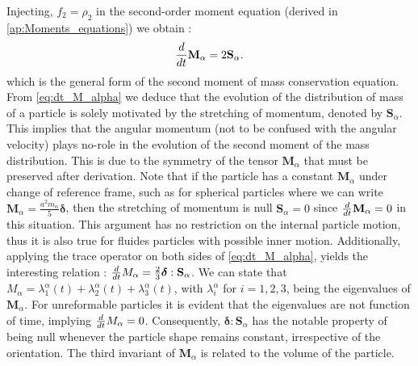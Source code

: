 Injecting, $f_2 = \rho_2$ in the second-order moment equation (derived in \ref{ap:Moments_equations}) we obtain :
\begin{equation}
    \frac{d}{dt} {\textbf{M}_\alpha}=2\textbf{S}_\alpha. 
    \label{eq:dt_M_alpha}
\end{equation}
which is the general form of the second moment of mass conservation equation. 
From \ref{eq:dt_M_alpha} we deduce that the evolution of the distribution of mass of a particle is solely motivated by the stretching of momentum, denoted by $\textbf{S}_\alpha$. 
This implies that the angular momentum (not to be confused with the angular velocity) plays no-role in the evolution of the second moment of the mass distribution. 
This is due to the symmetry of the tensor $\textbf{M}_\alpha$ that must be preserved after derivation. 
Note that if the particle has a constant $\textbf{M}_\alpha$ under change of reference frame, such as for spherical particles where we can write $\textbf{M}_\alpha= \frac{a^2 m_\alpha}{5} \bm\delta$, then the stretching of momentum is null $\textbf{S}_\alpha=0$ since $\frac{d}{dt} \textbf{M}_\alpha = 0$ in this situation.
This argument has no restriction on the internal particle motion, thus it is also true for fluides particles with possible inner motion. 
Additionally, applying the trace operator on both sides of \ref{eq:dt_M_alpha}, yields the interesting relation : $\frac{d}{dt} {M_\alpha}=\frac{2}{3}\bm\delta : \textbf{S}_\alpha$.
We can state that $M_\alpha = \lambda^\alpha_1(t)+\lambda^\alpha_2(t)+\lambda^\alpha_3(t)$, with $\lambda_i^\alpha$ for $i=1,2,3$, being the eigenvalues of $\textbf{M}_\alpha$.
For unreformable particles it is evident that the eigenvalues are not function of time, implying $\frac{d}{dt} M_\alpha = 0$.  
Consequently, $\bm\delta : \textbf{S}_\alpha$ has the notable property of being null whenever the particle shape remains constant, irrespective of the orientation.
The third invariant of $\textbf{M}_\alpha$ is related to the volume of the particle. 

